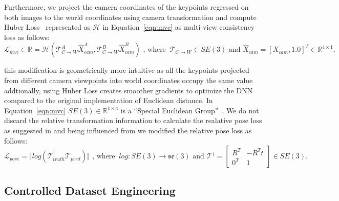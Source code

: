 Furthermore, we project the camera coordinates of the keypoints regressed on both images to the
world coordinates using camera transformation and compute Huber Loss~\cite{huber1992robust} represented as $\mathcal{H}$ in Equation~\ref{eqn:mvc} as multi-view consistency loss as follows:
\begin{equation}
    \label{eqn:mvc}
    \mathcal{L}_{mvc} \in \mathbb{R} = \mathcal{H}(\mathcal{T}_{C \rightarrow W}^A \hat{X}^A_{cam}, \mathcal{T}_{C \rightarrow W}^B \hat{X}^B_{cam}) \text{ , where  } \ \mathcal{T}_{C \rightarrow W} \in SE(3) \text{ and } \hat{X}_{cam}=[X_{cam}, 1.0]^T \in \mathbb{R}^{4 \times 1} ,
\end{equation}

this modification is geometrically more intuitive as all the keypoints projected from different camera viewpoints into world coordinates occupy the same value
addtionally, using Huber Loss creates smoother gradients to optimize the DNN compared to the original implementation of Euclidean distance.
In Equation~\ref{eqn:mvc} $SE(3) \in \mathbb{R}^{4 \times 4}$ is a ``Special Euclidean Group''~\cite{thurston2014three}.
We do not discard the relative transformation information to calculate the realative pose loss as suggested in \cite{suwajanakorn2018discovery}
and being influenced from \cite{zhao2020learning} we modified the relative pose loss as follows:
\begin{equation}
    \mathcal{L}_{pose} = \Vert log(\mathcal{T}_{truth}^{\dagger} \mathcal{T}_{pred}) \Vert \text{ , where  } \ log: SE(3) \rightarrow \mathfrak{se}(3) \text{ and } \mathcal{T}^{\dagger} = \begin{bmatrix}
        R^T & -R^T t \\
        0^T & 1
    \end{bmatrix} \in SE(3).
\end{equation}


\subsection{Controlled Dataset Engineering}

